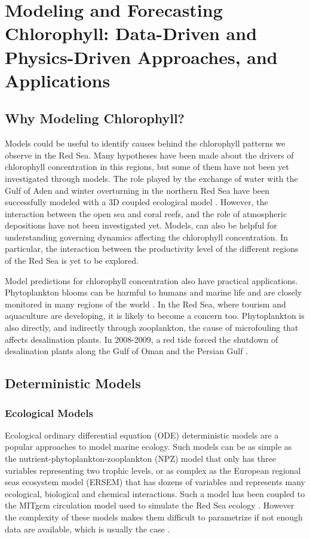 \section{Modeling and Forecasting Chlorophyll: Data-Driven and Physics-Driven Approaches, and Applications}

\subsection{Why Modeling Chlorophyll?}

Models could be useful to identify causes behind the chlorophyll patterns we observe in the Red Sea. Many hypotheses have been made about the drivers of chlorophyll concentration in this regions, but some of them have not been yet investigated through models. The role played by the exchange of water with the Gulf of Aden and winter overturning in the northern Red Sea have been successfully modeled with a 3D coupled ecological model \citep{Triantafyllou2014}. However, the interaction between the open sea and coral reefs, and the role of atmospheric depositions have not been investigated yet. Models, can also be helpful for understanding governing dynamics affecting the chlorophyll concentration. In particular, the interaction between the productivity level of the different regions of the Red Sea is yet to be explored.

Model predictions for chlorophyll concentration also have practical applications. Phytoplankton blooms can be harmful to humans and marine life and are closely monitored in many regions of the world \citep{Pettersson2013}. In the Red Sea, where tourism and aquaculture are developing, it is likely to become a concern too. Phytoplankton is also directly, and indirectly through zooplankton, the cause of microfouling that affects desalination plants. In 2008-2009, a red tide forced the shutdown of desalination plants along the Gulf of Oman and the Persian Gulf \citep{Richlen2010}.


\subsection{Deterministic Models}

\subsubsection{Ecological Models}

Ecological ordinary differential equation (ODE) deterministic models are a popular approaches to model marine ecology. Such models can be as simple as the nutrient-phytoplankton-zooplankton (NPZ) model that only has three variables representing two trophic levels, or as complex as the European regional seas ecosystem model (ERSEM) that has dozens of variables and represents many ecological, biological and chemical interactions. Such a model has been coupled to the MITgcm circulation model used to simulate the Red Sea ecology \citep{Triantafyllou2014}. However the complexity of these models makes them difficult to parametrize if not enough data are available, which is usually the case \citep{Anderson2005}.

